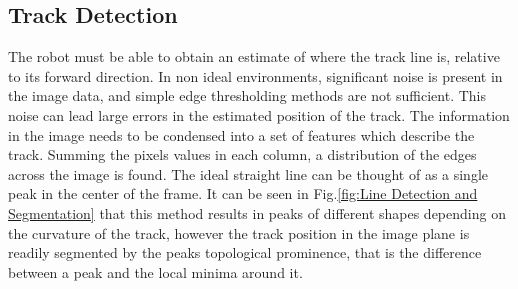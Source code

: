         \pagebreak{}
        \subsection{Track Detection}
        The robot must be able to obtain an estimate of where the track line is, relative to its forward direction.
        In non ideal environments, significant noise is present in the image data, 
        and simple edge thresholding methods are not sufficient. This noise can lead large errors
        in the estimated position of the track. The information in the image needs to be condensed into a set of features
        which describe the track. Summing the pixels values in each column, a distribution of the edges 
        across the image is found. The ideal straight line can be thought of as a single peak in the center of the frame.  
        It can be seen in Fig.\ref{fig:Line Detection and Segmentation} that this method results in peaks of different 
        shapes depending on the curvature of the track, however the track position in the image plane is readily 
        segmented by the peaks topological prominence, that is the difference between 
        a peak and the local minima around it. 
